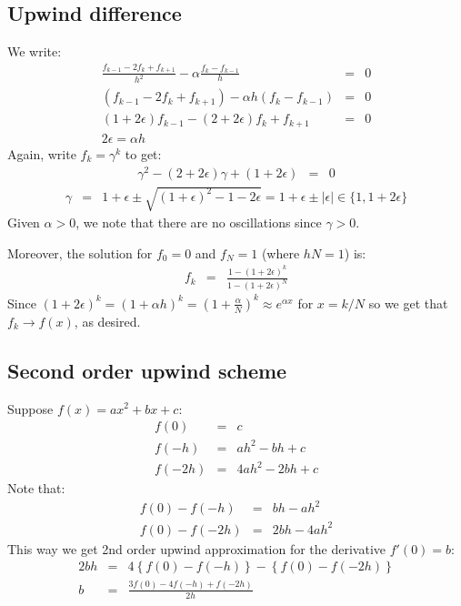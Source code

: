 \documentclass[11pt]{article}
\newcommand\eps \epsilon
\begin{document}
\subsection{Upwind difference}
We write:
\begin{eqnarray}
\frac{f_{k-1}-2f_k+f_{k+1}}{h^2} - \alpha \frac{f_k - f_{k-1}}{h} &=& 0 \\
(f_{k-1}-2f_k+f_{k+1}) - \alpha h (f_k - f_{k-1}) &=& 0 \\
(1 + 2\eps)f_{k-1}- (2 + 2\eps)f_k + f_{k+1} &=& 0 \\
2\eps = \alpha h
\end{eqnarray}
Again, write $f_k = \gamma^k$ to get:
\begin{eqnarray}
 \gamma^2 - (2 + 2\eps) \gamma + (1 + 2\eps) &=& 0
\end{eqnarray}
\begin{eqnarray}
\gamma &=& 1+\eps \pm \sqrt{(1+\eps)^2 - 1 - 2\eps} = 1 + \eps \pm |\eps| \in \{1, 1+2\eps\}
\end{eqnarray}
Given $\alpha > 0$, we note that there are no oscillations since $\gamma > 0$.

Moreover, the solution for $f_0 = 0$ and $f_N = 1$ (where $h N = 1$) is:
\begin{eqnarray}
f_k &=& \frac{1 - (1+2\eps)^k}{1 - (1+2\eps)^N}
\end{eqnarray}
Since $(1+2\eps)^k = (1+\alpha h)^k = \left(1 + \frac{\alpha}{N}\right)^k \approx e^{\alpha x}$ for $x = k/N$
so we get that $f_k \rightarrow f(x)$, as desired.
\subsection{Second order upwind scheme}
Suppose $f(x) = ax^2 + bx + c$:
\begin{eqnarray}
  f(0) &=& c \\
  f(-h) &=& ah^2 - bh + c \\
  f(-2h) &=& 4ah^2 - 2bh + c
\end{eqnarray}
Note that:
\begin{eqnarray}
  f(0) - f(-h) &=& bh - ah^2 \\
  f(0) - f(-2h) &=& 2bh - 4ah^2 
\end{eqnarray}
This way we get 2nd order upwind approximation for the derivative $f'(0) = b$:
\begin{eqnarray}
  2bh &=& 4\left\{f(0) - f(-h)\right\} - \left\{f(0) - f(-2h)\right\} \\
  b &=& \frac{3f(0) - 4f(-h) + f(-2h)}{2h}
\end{eqnarray}
\end{document}
